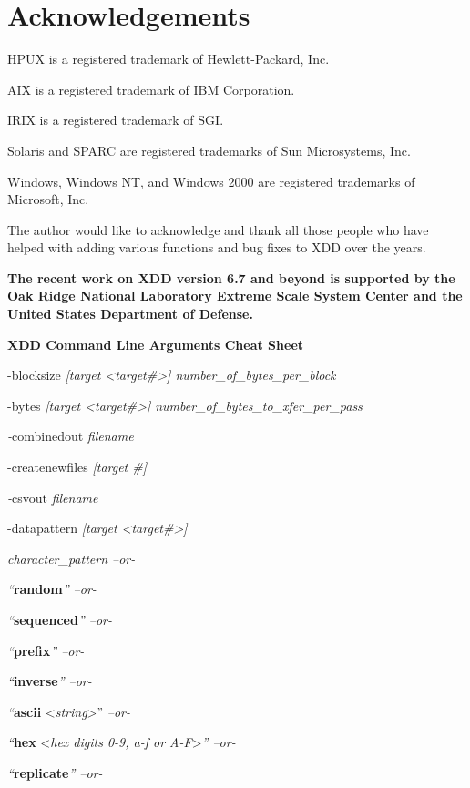 \newpage
\section{Acknowledgements}\label{acknowledgements-1}

HPUX is a registered trademark of Hewlett-Packard, Inc.

AIX is a registered trademark of IBM Corporation.

IRIX is a registered trademark of SGI.

Solaris and SPARC are registered trademarks of Sun Microsystems, Inc.

Windows, Windows NT, and Windows 2000 are registered trademarks of Microsoft, Inc.

The author would like to acknowledge and thank all those people who have helped with adding various functions and bug fixes to XDD over the years.

\textbf{The recent work on XDD version 6.7 and beyond is supported by the Oak Ridge National Laboratory Extreme Scale System Center and the United States Department of Defense.}

\textbf{XDD Command Line Arguments Cheat Sheet}

-blocksize \emph{{[}target \textless target\#\textgreater{]} number\_of\_bytes\_per\_block}

-bytes \emph{{[}target \textless target\#\textgreater{]} number\_of\_bytes\_to\_xfer\_per\_pass}

\emph{-}combinedout \emph{filename}

-createnewfiles \emph{{[}target \#{]}}

\emph{-}csvout \emph{filename}

-datapattern \emph{{[}target \textless target\#\textgreater{]}}

\emph{character\_pattern --or-}

\emph{``}\textbf{random}\emph{'' --or-}

\emph{``}\textbf{sequenced}\emph{'' --or-}

\emph{``}\textbf{prefix}\emph{'' --or-}

\emph{``}\textbf{inverse}\emph{'' --or-}

\emph{``}\textbf{ascii} \textless{}\emph{string}\textgreater'' \emph{--or-}

\emph{``}\textbf{hex} \textless{}\emph{hex digits 0-9, a-f or A-F}\textgreater{}\emph{'' --or-}

\emph{``}\textbf{replicate}\emph{'' --or-}

